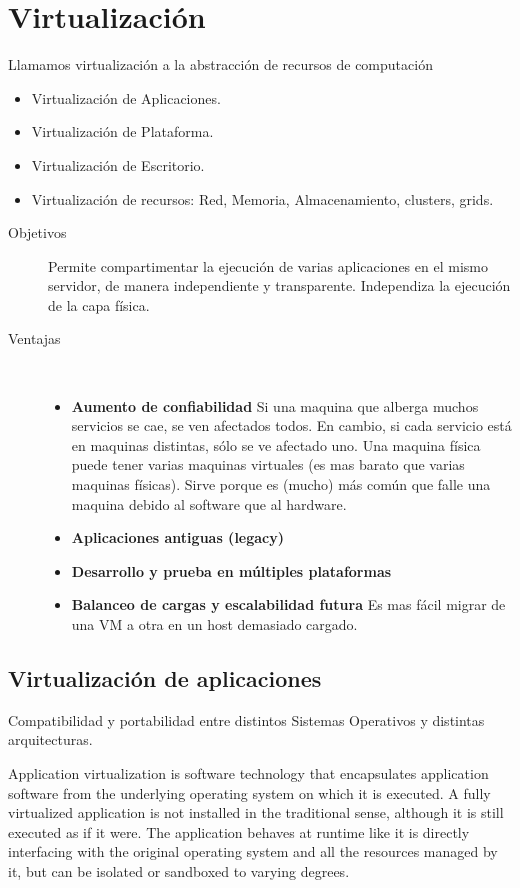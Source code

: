 \documentclass[a4paper, twoside]{article}
\begin{document}
\newpage
\section{Virtualización}

Llamamos virtualización a la abstracción de recursos de computación
\begin{itemize}
	\item Virtualización de Aplicaciones.
	\item Virtualización de Plataforma.
	\item Virtualización de Escritorio.
	\item Virtualización de recursos: Red, Memoria, Almacenamiento, clusters, grids.
\end{itemize}

\begin{description}
	\item[Objetivos] Permite compartimentar la ejecución de varias aplicaciones en el mismo servidor, de manera independiente y transparente. Independiza la ejecución de la capa física.

	\item[Ventajas] ~
	\begin{itemize}
		\item \textbf{Aumento de confiabilidad} Si una maquina que alberga muchos servicios se cae, se ven afectados todos. En cambio, si cada servicio está en maquinas distintas, sólo se ve afectado uno. Una maquina física puede tener varias maquinas virtuales (es mas barato que varias maquinas físicas). Sirve porque es (mucho) más común que falle una maquina debido al software que al hardware.
		\item \textbf{Aplicaciones antiguas (legacy)}
		\item \textbf{Desarrollo y prueba en múltiples plataformas}
		\item \textbf{Balanceo de cargas y escalabilidad futura} Es mas fácil migrar de una VM a otra en un host demasiado cargado.	
	\end{itemize}
\end{description}

\subsection{Virtualización de aplicaciones}
Compatibilidad y portabilidad entre distintos Sistemas Operativos y distintas arquitecturas.

Application virtualization is software technology that encapsulates application software from the underlying operating system on which it is executed. A fully virtualized application is not installed in the traditional sense, although it is still executed as if it were. The application behaves at runtime like it is directly interfacing with the original operating system and all the resources managed by it, but can be isolated or sandboxed to varying degrees.
\end{document}
